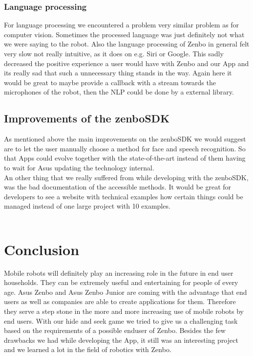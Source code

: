 \documentclass[conference]{IEEEtran}
\begin{document}
\subsubsection{Language processing}
For language processing we encountered a problem very similar problem as for computer vision. Sometimes the processed language was just definitely not 
what we were saying to the robot. Also the language processing of Zenbo in general felt very slow not really intuitive, as it does on e.g. Siri or Google.
This sadly decreased the positive experience a user would have with Zenbo and our App and its really sad that such a unnecessary thing stands in the way.
Again here it would be great to maybe provide a callback with a stream towards the microphones of the robot, then the NLP could be done by a external library.
\subsection{Improvements of the zenboSDK}
As mentioned above the main improvements on the zenboSDK we would suggest are to let the user manually choose a method for face and speech recognition.
So that Apps could evolve together with the state-of-the-art instead of them having to wait for Asus updating the technology internal.\\
An other thing that we really suffered from while developing with the zenboSDK, was the bad documentation of the accessible methods.
It would be great for developers to see a website with technical examples how certain things could be managed instead of one large project with 10 examples.\\\\
\section{Conclusion}
Mobile robots will definitely play an increasing role in the future in end user households. 
They can be extremely useful and entertaining for people of every age. Asus Zenbo and Asus Zenbo Junior
are coming with the advantage that end users as well as companies are able to create applications for them.
Therefore they serve a step stone in the more and more increasing use of mobile robots by end users.
With our hide and seek game we tried to give us a challenging task based on the requirements of a possible enduser of Zenbo.
Besides the few drawbacks we had while developing the App, it still was an interesting project and we learned a lot in the field of robotics
with Zenbo.\\\\ 
\end{document}

